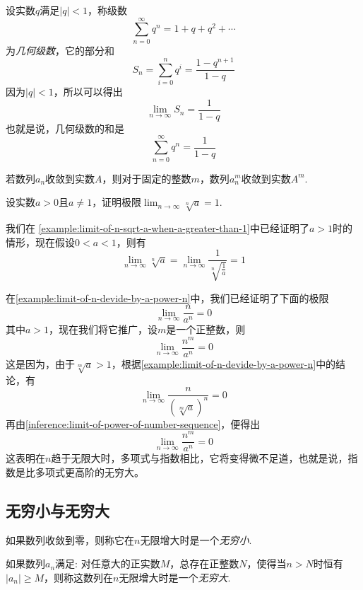 \begin{example}[几何级数]
  设实数$q$满足$|q|<1$，称级数
  \[ \sum_{n=0}^{\infty} q^n = 1+q+q^2+\cdots  \]
  为\emph{几何级数}，它的部分和
  \[ S_n = \sum_{i=0}^n q^i = \frac{1-q^{n+1}}{1-q} \]
  因为$|q|<1$，所以可以得出
  \[ \lim_{n \to \infty} S_n = \frac{1}{1-q} \]
  也就是说，几何级数的和是
  \[ \sum_{n=0}^{\infty} q^n = \frac{1}{1-q} \]
\end{example}

\begin{inference}
  \label{inference:limit-of-power-of-number-sequence}
  若数列$a_n$收敛到实数$A$，则对于固定的整数$m$，数列$a_n^m$收敛到实数$A^m$.
\end{inference}

\begin{example}
  \label{example:limit-of-n-sqrt-a}
  设实数$a>0$且$a \neq 1$，证明极限$\lim_{n \to \infty} \sqrt[n]{a} = 1$.

  我们在 \autoref{example:limit-of-n-sqrt-a-when-a-greater-than-1}中已经证明了$a>1$时的情形，现在假设$0<a<1$，则有
  \[ \lim_{n \to \infty} \sqrt[n]{a} = \lim_{n \to \infty} \frac{1}{\sqrt[n]{\frac{1}{a}}} = 1 \]
\end{example}

\begin{example}
  \label{example:limit-of-n-power-m-devide-by-a-power-n}
  在\autoref{example:limit-of-n-devide-by-a-power-n}中，我们已经证明了下面的极限
  \[ \lim_{n \to \infty} \frac{n}{a^n} = 0 \]
  其中$a>1$，现在我们将它推广，设$m$是一个正整数，则
  \[ \lim_{n \to \infty} \frac{n^m}{a^n} = 0 \]
  这是因为，由于$\sqrt[m]{a}>1$，根据\autoref{example:limit-of-n-devide-by-a-power-n}中的结论，有
  \[ \lim_{n \to \infty} \frac{n}{(\sqrt[m]{a})^n} = 0 \]
 再由\autoref{inference:limit-of-power-of-number-sequence}，便得出
  \[ \lim_{n \to \infty} \frac{n^m}{a^n} = 0 \]
  这表明在$n$趋于无限大时，多项式与指数相比，它将变得微不足道，也就是说，指数是比多项式更高阶的无穷大。
\end{example}


\subsection{无穷小与无穷大}
\label{sec:infinite-small-and-great}

\begin{definition}
  如果数列收敛到零，则称它在$n$无限增大时是一个\emph{无穷小}.
\end{definition}

\begin{definition}
  如果数列$a_n$满足: 对任意大的正实数$M$，总存在正整数$N$，使得当$n>N$时恒有$|a_n|\geqslant M$，则称这数列在$n$无限增大时是一个\emph{无穷大}.
\end{definition}

